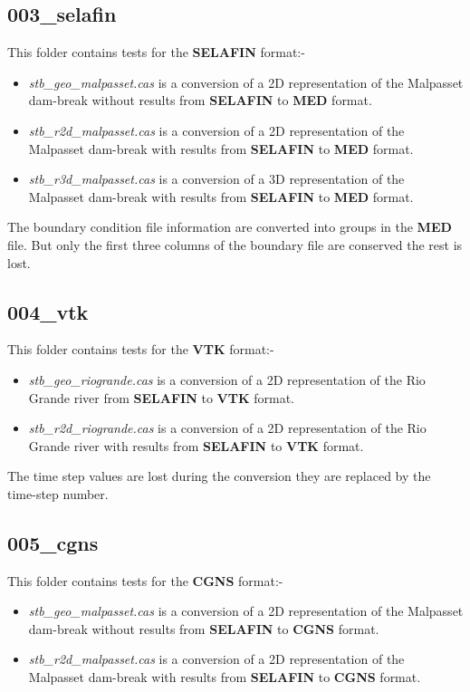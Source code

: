\documentclass[a4paper,10pt]{article}
\newcommand{\slf}{\textbf{SELAFIN}\xspace}
\newcommand{\med}{\textbf{MED}\xspace}
\newcommand{\vtk}{\textbf{VTK}\xspace}
\newcommand{\cgns}{\textbf{CGNS}\xspace}
\begin{document}
\subsection{003\_selafin}

This folder contains tests for the \slf format:-
\begin{itemize}
\item \textit{stb\_geo\_malpasset.cas} is a conversion of a 2D representation
of the Malpasset dam-break without results from \slf to \med format.
\item \textit{stb\_r2d\_malpasset.cas} is a conversion of a 2D representation
of the Malpasset dam-break with results from \slf to \med format.
\item \textit{stb\_r3d\_malpasset.cas} is a conversion of a 3D representation
of the Malpasset dam-break with results from \slf to \med format.
\end{itemize}
The boundary condition file information are converted into groups in the \med
file.  But only the first three columns of the boundary file are conserved the
rest is lost.

\subsection{004\_vtk}

This folder contains tests for the \vtk format:-
\begin{itemize}
\item \textit{stb\_geo\_riogrande.cas} is a conversion of a 2D representation
of the Rio Grande river from \slf to \vtk format.
\item \textit{stb\_r2d\_riogrande.cas} is a conversion of a 2D representation
of the Rio Grande river with results from \slf to \vtk format.
\end{itemize}
The time step values are lost during the conversion they are replaced by the
time-step number.

\subsection{005\_cgns}

This folder contains tests for the \cgns format:-
\begin{itemize}
\item \textit{stb\_geo\_malpasset.cas} is a conversion of a 2D representation
of the Malpasset dam-break without results from \slf to \cgns format.
\item \textit{stb\_r2d\_malpasset.cas} is a conversion of a 2D representation
of the Malpasset dam-break with results from \slf to \cgns format.
\end{itemize}
\end{document}
